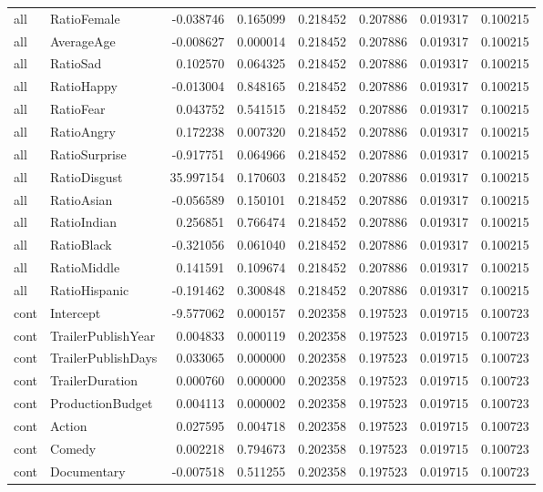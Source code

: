 \begin{tabular}{llrrrrrr}
all & RatioFemale & -0.038746 & 0.165099 & 0.218452 & 0.207886 & 0.019317 & 0.100215 \\
all & AverageAge & -0.008627 & 0.000014 & 0.218452 & 0.207886 & 0.019317 & 0.100215 \\
all & RatioSad & 0.102570 & 0.064325 & 0.218452 & 0.207886 & 0.019317 & 0.100215 \\
all & RatioHappy & -0.013004 & 0.848165 & 0.218452 & 0.207886 & 0.019317 & 0.100215 \\
all & RatioFear & 0.043752 & 0.541515 & 0.218452 & 0.207886 & 0.019317 & 0.100215 \\
all & RatioAngry & 0.172238 & 0.007320 & 0.218452 & 0.207886 & 0.019317 & 0.100215 \\
all & RatioSurprise & -0.917751 & 0.064966 & 0.218452 & 0.207886 & 0.019317 & 0.100215 \\
all & RatioDisgust & 35.997154 & 0.170603 & 0.218452 & 0.207886 & 0.019317 & 0.100215 \\
all & RatioAsian & -0.056589 & 0.150101 & 0.218452 & 0.207886 & 0.019317 & 0.100215 \\
all & RatioIndian & 0.256851 & 0.766474 & 0.218452 & 0.207886 & 0.019317 & 0.100215 \\
all & RatioBlack & -0.321056 & 0.061040 & 0.218452 & 0.207886 & 0.019317 & 0.100215 \\
all & RatioMiddle & 0.141591 & 0.109674 & 0.218452 & 0.207886 & 0.019317 & 0.100215 \\
all & RatioHispanic & -0.191462 & 0.300848 & 0.218452 & 0.207886 & 0.019317 & 0.100215 \\
cont & Intercept & -9.577062 & 0.000157 & 0.202358 & 0.197523 & 0.019715 & 0.100723 \\
cont & TrailerPublishYear & 0.004833 & 0.000119 & 0.202358 & 0.197523 & 0.019715 & 0.100723 \\
cont & TrailerPublishDays & 0.033065 & 0.000000 & 0.202358 & 0.197523 & 0.019715 & 0.100723 \\
cont & TrailerDuration & 0.000760 & 0.000000 & 0.202358 & 0.197523 & 0.019715 & 0.100723 \\
cont & ProductionBudget & 0.004113 & 0.000002 & 0.202358 & 0.197523 & 0.019715 & 0.100723 \\
cont & Action & 0.027595 & 0.004718 & 0.202358 & 0.197523 & 0.019715 & 0.100723 \\
cont & Comedy & 0.002218 & 0.794673 & 0.202358 & 0.197523 & 0.019715 & 0.100723 \\
cont & Documentary & -0.007518 & 0.511255 & 0.202358 & 0.197523 & 0.019715 & 0.100723 \\

\end{tabular}
